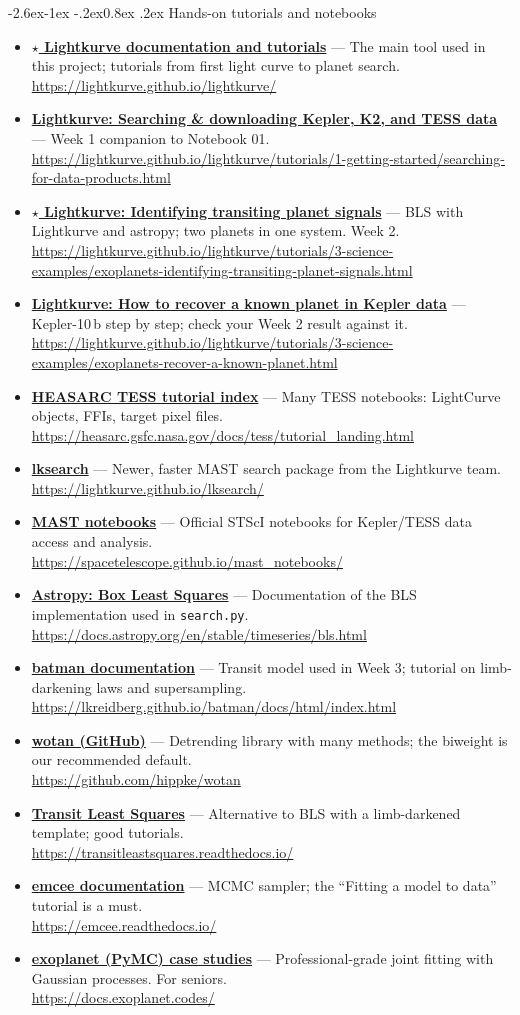 \documentclass[11pt,a4paper]{article}
\makeatletter
\renewcommand\subsection{\@startsection{subsection}{2}{\z@}%
  {-2.6ex\@plus -1ex \@minus -.2ex}{0.8ex \@plus .2ex}%
  {\normalfont\sffamily\Large\bfseries\color{navy}}}
\newcommand{\res}[3]{\item \textbf{\href{#2}{#1}} --- #3\\[-1pt]{\scriptsize\color{gray}\url{#2}}}
\newenvironment{reslist}{\begin{itemize}\setlength{\itemsep}{5pt}}{\end{itemize}}
\makeatother
\begin{document}
\subsection{Hands-on tutorials and notebooks}
\begin{reslist}
\res{\(\star\) Lightkurve documentation and tutorials}{https://lightkurve.github.io/lightkurve/}{The main tool used in this project; tutorials from first light curve to planet search.}
\res{Lightkurve: Searching \& downloading Kepler, K2, and TESS data}{https://lightkurve.github.io/lightkurve/tutorials/1-getting-started/searching-for-data-products.html}{Week 1 companion to Notebook 01.}
\res{\(\star\) Lightkurve: Identifying transiting planet signals}{https://lightkurve.github.io/lightkurve/tutorials/3-science-examples/exoplanets-identifying-transiting-planet-signals.html}{BLS with Lightkurve and astropy; two planets in one system. Week 2.}
\res{Lightkurve: How to recover a known planet in Kepler data}{https://lightkurve.github.io/lightkurve/tutorials/3-science-examples/exoplanets-recover-a-known-planet.html}{Kepler-10\,b step by step; check your Week 2 result against it.}
\res{HEASARC TESS tutorial index}{https://heasarc.gsfc.nasa.gov/docs/tess/tutorial_landing.html}{Many TESS notebooks: LightCurve objects, FFIs, target pixel files.}
\res{lksearch}{https://lightkurve.github.io/lksearch/}{Newer, faster MAST search package from the Lightkurve team.}
\res{MAST notebooks}{https://spacetelescope.github.io/mast_notebooks/}{Official STScI notebooks for Kepler/TESS data access and analysis.}
\res{Astropy: Box Least Squares}{https://docs.astropy.org/en/stable/timeseries/bls.html}{Documentation of the BLS implementation used in \texttt{search.py}.}
\res{batman documentation}{https://lkreidberg.github.io/batman/docs/html/index.html}{Transit model used in Week 3; tutorial on limb-darkening laws and supersampling.}
\res{wotan (GitHub)}{https://github.com/hippke/wotan}{Detrending library with many methods; the biweight is our recommended default.}
\res{Transit Least Squares}{https://transitleastsquares.readthedocs.io/}{Alternative to BLS with a limb-darkened template; good tutorials.}
\res{emcee documentation}{https://emcee.readthedocs.io/}{MCMC sampler; the ``Fitting a model to data'' tutorial is a must.}
\res{exoplanet (PyMC) case studies}{https://docs.exoplanet.codes/}{Professional-grade joint fitting with Gaussian processes. For seniors.}
\end{reslist}
\end{document}
